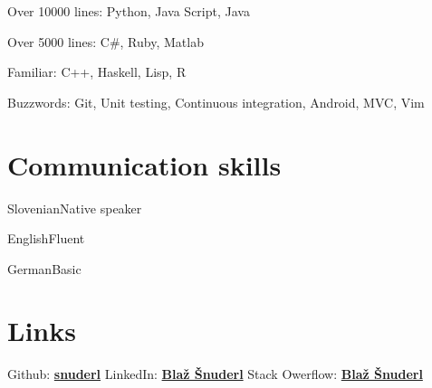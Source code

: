 \documentclass{tccv}
\begin{document}
\begin{factlist}

\item{Over 10000 lines:}
     {Python, Java Script, Java}

\item{Over 5000 lines:}
     {C\#, Ruby, Matlab}
     
\item{Familiar:}
     {C++, Haskell, Lisp, R}

\item{Buzzwords:}
     {Git, Unit testing, Continuous integration, Android, MVC, Vim}

\end{factlist}

\section{Communication skills}

\begin{factlist}
\item{Slovenian}{Native speaker}
\item{English}{Fluent}
\item{German}{Basic}
\end{factlist}

\section{Links} 
Github: \href{https://github.com/snuderl}{\textbf{snuderl}} \newline
LinkedIn:  \href{https://www.linkedin.com/pub/bla\%C5\%BE-\%C5\%A1nuderl/25/679/b84}{\textbf{Blaž Šnuderl}} \newline
Stack Owerflow: \href{http://stackoverflow.com/users/928489/bla\%C5\%BE-\%C5\%A1nuderl}{\textbf{Blaž Šnuderl}}
\end{document}
